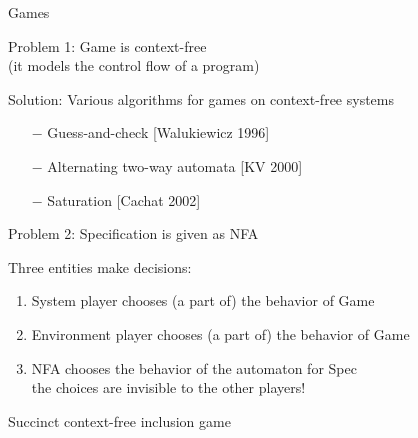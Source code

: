 \documentclass[../talk.tex]{subfiles}
\begin{document}
\begin{frame}{Games}
    \begin{overlayarea}{\slidewidth}{\slideheight}

            \begin{problem}
            \end{problem}

        {%

                Problem 1: Game is context-free
                    \\
                    \quad (it models the control flow of a program)


            \vspace*{1em}

            Solution: Various algorithms for games on context-free systems
                \begin{itemize}
                    \item[$-$] Guess-and-check [Walukiewicz 1996]
                    \item[$-$] Alternating two-way automata [KV 2000]
                    \item[$-$] Saturation [Cachat 2002]
                \end{itemize}
        }

        {%
            Problem 2: Specification is given as NFA

            \vspace*{1em}

                Three entities make decisions:
                \begin{enumerate}[1)]
                    \item System player chooses (a part of) the behavior of Game
                    \item Environment player chooses (a part of) the behavior of Game
                    \item NFA chooses the behavior of the automaton for Spec
                        \\
                        \quad the choices are \alert{invisible} to the other players!
                \end{enumerate}
        }
        {%
            \alert{Succinct context-free inclusion game}

}
\end{overlayarea}
\end{frame}
\end{document}
